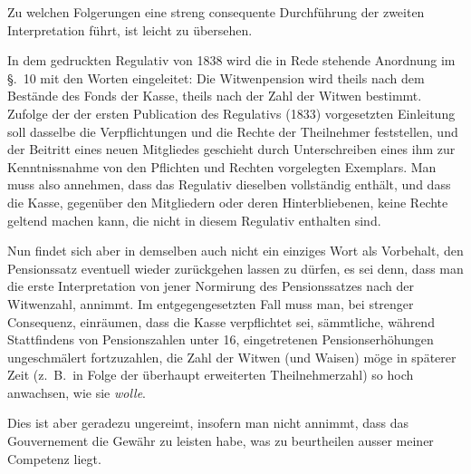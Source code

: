 \documentclass[12pt,a4paper]{article}
\begin{document}
Zu welchen Folgerungen eine streng consequente Durchf\"uhrung der zweiten Interpretation f\"uhrt, ist leicht zu \"ubersehen.

In dem gedruckten Regulativ von 1838 wird die in Rede stehende Anordnung im \S.\ 10 mit den Worten eingeleitet: Die Witwenpension wird theils nach dem Best\"ande des Fonds der Kasse, theils nach der Zahl der Witwen bestimmt. Zufolge der der ersten Publication des Regulativs (1833) vorgesetzten Einleitung soll dasselbe die Verpflichtungen und die Rechte der Theilnehmer feststellen, und der Beitritt eines neuen Mitgliedes geschieht durch Unterschreiben eines ihm zur Kenntnissnahme von den Pflichten und Rechten vorgelegten Exemplars. Man muss also annehmen, dass das Regulativ dieselben vollst\"andig enth\"alt, und dass die Kasse, gegen\"uber den Mitgliedern oder deren Hinterbliebenen, keine Rechte geltend machen kann, die nicht in diesem Regulativ enthalten sind.

Nun findet sich aber in demselben auch nicht ein einziges Wort als Vorbehalt, den Pensionssatz eventuell wieder zur\"uckgehen lassen zu d\"urfen, es sei denn, dass man die erste Interpretation von jener Normirung des Pensionssatzes nach der Witwenzahl, annimmt. Im entgegengesetzten Fall muss man, bei strenger Consequenz, einr\"aumen, dass die Kasse verpflichtet sei, s\"ammtliche, w\"ahrend Stattfindens von Pensionszahlen unter 16, eingetretenen Pensionserh\"ohungen ungeschm\"alert fortzuzahlen, die Zahl der Witwen (und Waisen) m\"oge in sp\"aterer Zeit (z.\ B.\ in Folge der \"uberhaupt erweiterten Theilnehmerzahl) so hoch anwachsen, wie sie \textit{wolle}.

Dies ist aber geradezu ungereimt, insofern man nicht annimmt, dass das Gouvernement die Gew\"ahr zu leisten habe, was zu beurtheilen ausser meiner Competenz liegt.
\end{document}
